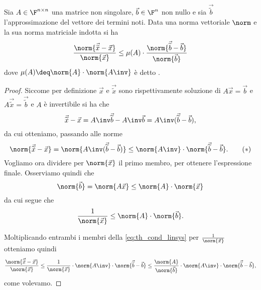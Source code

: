 \begin{theorem}
    Sia $A \in \Mat{\F, n, n}$ una matrice non singolare, $\vec b \in \F^n$ non nullo e sia $\vec{\tilde b}$ l'approssimazione del vettore dei termini noti. Data una norma vettoriale $\norm$ e la sua norma matriciale indotta si ha \[
        \frac{\norm{\vec{\tilde x} - \vec x}}{\norm{\vec x}} \leq \mu(A) \cdot\frac{\norm{\vec{\tilde b} - \vec b}}{\norm{\vec b}} 
    \] dove $\mu(A) \deq \norm{A} \cdot \norm{A\inv}$ è detto . 
\end{theorem}
\begin{proof}
    Siccome per definizione $\vec x$ e $\vec{\tilde x}$ sono rispettivamente soluzione di $A\vec x = \vec b$ e $A\vec{\tilde x} = \vec{\tilde b}$ e $A$ è invertibile si ha che \[
        \vec{\tilde x} - \vec x = A\inv\vec{\tilde b} - A\inv\vec b = A\inv(\vec{\tilde b} - \vec b),
    \] da cui otteniamo, passando alle norme \begin{equation}\label{eq:th_cond_linsys}
        \norm{\vec{\tilde x} - \vec x} = \norm{A\inv(\vec{\tilde b} - \vec b)} \leq \norm{A\inv} \cdot \norm{\vec{\tilde b} - \vec b}.  \tag{$\ast$}
    \end{equation} Vogliamo ora dividere per $\norm{\vec x}$ il primo membro, per ottenere l'espressione finale. Osserviamo quindi che \[
        \norm{\vec b} = \norm{A\vec x} \leq \norm{A} \cdot \norm{\vec x}
    \] da cui segue che \[
        \frac{1}{\norm{\vec x}} \leq \norm{A} \cdot \norm{\vec b}.
    \]

    Moltiplicando entrambi i membri della \eqref{eq:th_cond_linsys} per $\frac{1}{\norm{\vec x}}$ otteniamo quindi \[
        \frac{\norm{\vec{\tilde x} - \vec x}}{\norm{\vec x}} 
        \leq \frac{1}{\norm{\vec x}} \cdot \norm{A\inv} \cdot \norm{\vec{\tilde b} - \vec b}
        \leq \frac{\norm{A}}{\norm{\vec b}} \cdot \norm{A\inv} \cdot \norm{\vec{\tilde b} - \vec b},
    \] come volevamo.
\end{proof}
